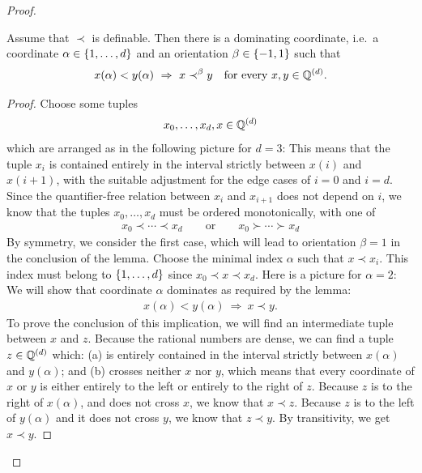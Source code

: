\begin{proof}
    \begin{lemma}\label{lem:rational-dominating-coordinate} Assume that $\prec$ is definable. 
Then there is a dominating coordinate, i.e.~a coordinate $\alpha \in \{1,\ldots,d\}$ and an orientation $\beta \in \{-1,1\}$ such that 
\begin{align*}
x(\alpha) < y(\alpha) \ \Rightarrow \ x \prec^\beta y  
\quad \text{for every }x,y \in {\mathbb Q}^{(d)}.
\end{align*}
    \end{lemma}
\begin{proof}
    Choose some   tuples
        \begin{align*}
        x_0,\ldots,x_d, x \in {\mathbb Q}^{(d)}
        \end{align*}
    which are arranged  as in the following picture for $d=3$:
        This means that the tuple $x_i$ is contained entirely in the interval strictly between $x(i)$ and $x(i+1)$, with the suitable adjustment for the edge cases of $i=0$ and $i=d$.
        Since the quantifier-free relation between $x_i$ and $x_{i+1}$ does not depend on $i$, we know that the tuples $x_0,\ldots,x_d$  must be ordered  monotonically, with one of
        \begin{align*}
x_0 \prec \cdots \prec x_d \qquad \text{or} \qquad x_0 \succ \cdots \succ x_d
        \end{align*}
        By symmetry, we consider the first case, which will lead to  orientation $\beta =1$ in the conclusion of the lemma. Choose the minimal index $\alpha$ such that $x \prec x_i$.
        This index must belong to $\{1,\ldots,d\}$ since   $x_0 \prec x \prec x_d$.  Here is a picture for  $\alpha=2$:
        We will show that coordinate $\alpha$  dominates as required by the lemma:
        \begin{align*}
        x(\alpha) < y(\alpha) \ \Rightarrow \ x \prec y.
        \end{align*}
        To prove the conclusion of this implication, we will find an intermediate tuple between $x$ and $z$.  Because the rational numbers are dense, we can find a  tuple $z \in {\mathbb Q}^{(d)}$ which: (a) is entirely contained in the interval strictly between $x(\alpha)$ and $y(\alpha)$; and (b)  crosses neither $x$ nor $y$, which means that every coordinate of $x$ or $y$ is either entirely to the left or entirely to the right of $z$. Because $z$ is to the right of $x(\alpha)$, and  does not cross $x$, we know that $x \prec z$. Because $z$ is to the left of $y(\alpha)$ and  it does not cross $y$, we know that $z \prec y$. By transitivity, we get $x \prec y$.
        \end{proof}


\end{proof}
